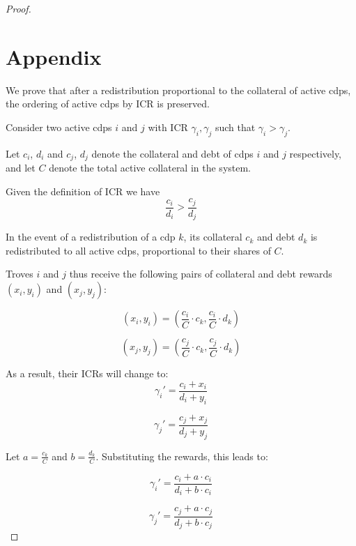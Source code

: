 \documentclass[reqno]{article}
\begin{document}
\begin{proof}
\pagebreak
\appendix
\section{Appendix} \label{sec:appendix}
We prove that after a redistribution proportional to the collateral of active cdps, the ordering of active cdps by ICR is preserved. 

Consider two active cdps $i$ and $j$ with ICR $\gamma_i,  \gamma_j$ such that $\gamma_i > \gamma_j$.

Let $c_i$, $d_i$ and $c_j$, $d_j$ denote the collateral and debt of cdps $i$ and $j$ respectively, and let $C$ denote the total active collateral in the system.

Given the definition of ICR we have 
\begin{equation} \label{eq:92}
    \frac{c_i}{d_i}>\frac{c_j}{d_j}
\end{equation}

In the event of a redistribution of a cdp $k$, its collateral $c_k$ and debt $d_k$ is redistributed to all active cdps, proportional to their shares of $C$.

Troves $i$ and $j$ thus receive the following pairs of collateral and debt rewards $(x_i, y_i)$ and $(x_j, y_j)$:

\begin{equation} 
  (x_i, y_i) = \left(\frac{c_i}{C} \cdot c_k, \frac{c_i}{C} \cdot d_k\right)
\end{equation}

\begin{equation} 
   (x_j, y_j) = \left(\frac{c_j}{C} \cdot c_k, \frac{c_j}{C} \cdot d_k\right)
\end{equation}

As a result, their ICRs will change to:
\begin{equation} 
  \gamma_i' = \frac{c_i + x_i}{d_i + y_i} 
\end{equation}

\begin{equation} 
  \gamma_j' = \frac{c_j + x_j}{d_j + y_j} 
\end{equation}

Let $a = \frac{c_k}{C}$ and $b = \frac{d_k}{C}$. Substituting the rewards, this leads to:

\begin{equation} \label{eq:97}
  \gamma_i' = \frac{c_i + a \cdot c_i}{d_i + b \cdot c_i} 
\end{equation}

\begin{equation} \label{eq:98}
  \gamma_j' = \frac{c_j + a \cdot c_j}{d_j + b \cdot c_j} 
\end{equation}


\end{proof}
\end{document}
